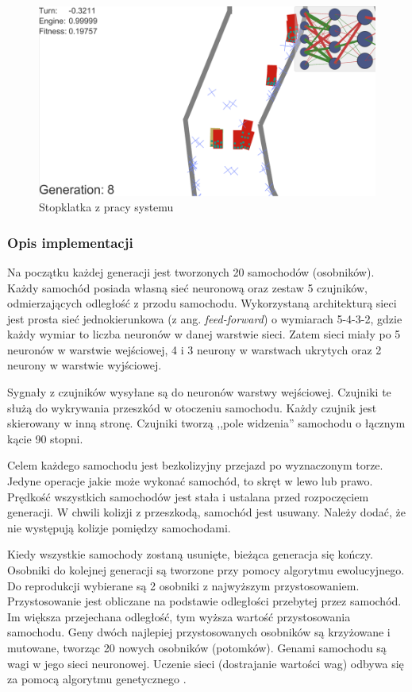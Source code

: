 \begin{figure}[h]
\begin{center}
\includegraphics[width=16cm]{resources/figures/samuelArtzDeepCars.png}
\caption{Stopklatka z pracy systemu}
\label{SamuelArtzDeepLearningCars}
\end{center}
\end{figure}

\subsubsection{Opis implementacji}
Na początku każdej generacji jest tworzonych 20 samochodów (osobników). Każdy samochód posiada własną sieć neuronową oraz zestaw 5 czujników, odmierzających odległość z przodu samochodu. Wykorzystaną architekturą sieci jest prosta sieć jednokierunkowa (z ang. \textit{feed-forward}) o wymiarach 5-4-3-2, gdzie każdy wymiar to liczba neuronów w danej warstwie sieci. Zatem sieci miały po 5 neuronów w warstwie wejściowej, 4 i 3 neurony w warstwach ukrytych oraz 2 neurony w warstwie wyjściowej.

Sygnały z czujników wysyłane są do neuronów warstwy wejściowej.
Czujniki te służą do wykrywania przeszkód w otoczeniu samochodu.
Każdy czujnik jest skierowany w inną stronę.
Czujniki tworzą ,,pole widzenia'' samochodu o łącznym kącie 90 stopni.

Celem każdego samochodu jest bezkolizyjny przejazd po wyznaczonym torze.
Jedyne operacje jakie może wykonać samochód, to skręt w lewo lub prawo.
Prędkość wszystkich samochodów jest stała i ustalana przed rozpoczęciem generacji.
W chwili kolizji z przeszkodą, samochód jest usuwany. Należy dodać, że nie występują kolizje pomiędzy samochodami.

Kiedy wszystkie samochody zostaną usunięte, bieżąca generacja się kończy.
Osobniki do kolejnej generacji są tworzone przy pomocy algorytmu ewolucyjnego. Do reprodukcji wybierane są 2 osobniki z najwyższym przystosowaniem. Przystosowanie jest obliczane na podstawie odległości przebytej przez samochód. Im większa przejechana odległość, tym wyższa wartość przystosowania samochodu. Geny dwóch najlepiej przystosowanych osobników są krzyżowane i mutowane, tworząc 20 nowych osobników (potomków). Genami samochodu są wagi w jego sieci neuronowej. Uczenie sieci (dostrajanie wartości wag) odbywa się za pomocą algorytmu genetycznego \cite{geneticAlgorithm:introduction}.

